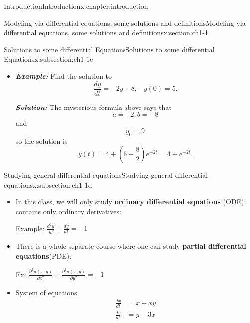 \documentclass[oneside,10pt,]{book}
\newcommand{\alert}[1]{\textbf{\textit{#1}}}
\newcommand{\terminology}[1]{\textbf{#1}}
\numberwithin{equation}{section}
\numberwithin{equation}{section}
\newcommand{\amp}{&}
\begin{document}
\begin{chapterptx}{Introduction}{}{Introduction}{}{}{x:chapter:introduction}
\begin{sectionptx}{Modeling via differential equations, some solutions and definitions}{}{Modeling via differential equations, some solutions and definitions}{}{}{x:section:ch1-1}
\begin{subsectionptx}{Solutions to some differential Equations}{}{Solutions to some differential Equations}{}{}{x:subsection:ch1-1c}
\begin{itemize}[label=\textbullet]
\begin{equation*}
\frac{dy}{dt}=ay-b,\,\,\,\,\,\,y(0)=y_{0}.
\end{equation*}
%
\par
The \alert{general solution} to this differential equation is%
\begin{equation*}
y(t)=\frac{b}{a}+\left(y_{0}-\frac{b}{a}\right)e^{at}
\end{equation*}
\emph{We will see how one can get this very soon!}%
\item{}\alert{Example:} Find the solution to%
\begin{equation*}
\frac{dy}{dt}=-2y+8,\,\,\,\,\,y(0)=5.
\end{equation*}
%
\par
\alert{Solution:} The mysterious formula above says that%
\begin{equation*}
a=-2,b=-8
\end{equation*}
and%
\begin{equation*}
y_{0}=9
\end{equation*}
so the solution is%
\begin{equation*}
y(t)=4+\left(5-\frac{8}{2}\right)e^{-2t}=4+e^{-2t}.
\end{equation*}
%
\end{itemize}
\end{subsectionptx}
%
%
\typeout{************************************************}
\typeout{************************************************}
%
\begin{subsectionptx}{Studying general differential equations}{}{Studying general differential equations}{}{}{x:subsection:ch1-1d}
%
\begin{itemize}[label=\textbullet]
\item{}In this class, we will only study \terminology{ordinary differential equations} (ODE): contains only ordinary derivatives:%
\par
Example: \(\frac{d^{2}y}{dt^{2}}+\frac{dy}{dt}=-1\)%
\item{}There is a whole separate course where one can study \terminology{partial differential equations}(PDE):%
\par
Ex: \(\frac{\partial^{2}u(x,y)}{\partial x^{2}}+\frac{\partial^{2}u(x,y)}{\partial y^{2}}=-1\)%
\item{}System of equations:%
\begin{align*}
\frac{dx}{dt} \amp =x-xy\\
\frac{dv}{dt} \amp =y-3x

\end{align*}
\end{itemize}
\end{subsectionptx}
\end{sectionptx}
\end{chapterptx}
\end{document}
